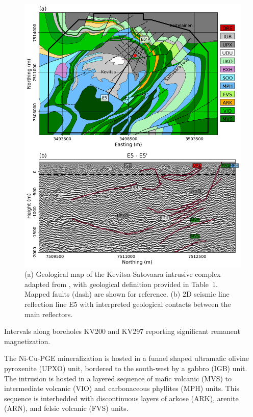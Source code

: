 \documentclass[paper]{geophysics}
\begin{document}
\begin{figure}[p!]
\includegraphics[width=\columnwidth]{Figures/Figure8.png}
\caption{(a) Geological map of the Kevitsa-Satovaara intrusive complex adapted from \cite{Koivisto2015}, with geological definition provided in Table~1. Mapped faults (dash) are shown for reference. (b) 2D seismic line reflection line E5 with interpreted geological contacts between the main reflectors.}
\label{Kevitsa_Geology}
\end{figure}

\begin{table}
\caption{Intervals along boreholes KV200 and KV297 reporting significant remanent magnetization.}
\label{Table1}
\end{table}

The Ni-Cu-PGE mineralization is hosted in a funnel shaped ultramafic olivine pyroxenite (UPXO) unit, bordered to the south-west by a gabbro (IGB) unit. The intrusion is hosted in a layered sequence of mafic volcanic (MVS) to intermediate volcanic (VIO) and carbonaceous phyllites (MPH) units. This sequence is interbedded with discontinuous layers of arkose (ARK), arenite (ARN), and felsic volcanic (FVS) units.
\end{document}
